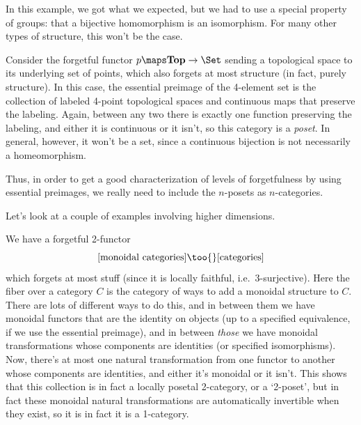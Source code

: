 \documentclass[12pt]{amsart}
\begin{document}
In this example, we got what we expected, but we had to use a
special property of groups: that a bijective homomorphism is an
isomorphism.  For many other types of structure, this won't be the
case.

\begin{eg}
  Consider the forgetful functor $p\maps \mathbf{Top}\to\Set$ sending
  a topological space to its underlying set of points, which also
  forgets at most structure (in fact, purely structure).  In this
  case, the essential preimage of the 4-element set is the collection
  of labeled 4-point topological spaces and continuous maps that
  preserve the labeling.  Again, between any two there is exactly one
  function preserving the labeling, and either it is continuous or it
  isn't, so this category is a \emph{poset}.  In general, however, it
  won't be a set, since a continuous bijection is not necessarily a
  homeomorphism.
\end{eg}

Thus, in order to get a good characterization of levels of
forgetfulness by using essential preimages, we really need to include
the $n$-posets as $n$-categories.

Let's look at a couple of examples involving higher dimensions.

\begin{eg}
  We have a forgetful 2-functor
  \[[\text{monoidal categories}]\too{} [\text{categories}]\]
  which forgets at most stuff (since it is locally faithful, i.e.\
  3-surjective).  Here the fiber over a category $C$ is the
  category of ways to add a monoidal structure to $C$.  There are
  lots of different ways to do this, and in between them we have
  monoidal functors that are the identity on objects (up to a
  specified equivalence, if we use the essential preimage), and in
  between \emph{those} we have monoidal transformations whose
  components are identities (or specified isomorphisms).  Now, there's
  at most one natural transformation from one functor to another whose
  components are identities, and either it's monoidal or it isn't.
  This shows that this collection is in fact a locally posetal
  2-category, or a `2-poset', but in fact these monoidal natural
  transformations are automatically invertible when they exist, so it
  is in fact it is a 1-category.
\end{eg}
\end{document}
